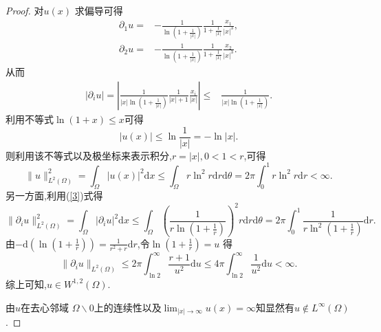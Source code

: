 \begin{proof}
  对$u(x)$ 求偏导可得
  \begin{align*}
    \partial_1u=&-\frac{1}{\ln(1+\frac{1}{|x|})}\frac{1}{1+\frac{1}{|x|}} \frac{x_1}{|x|^3},\\ 
    \partial_2u=&-\frac{1}{\ln(1+\frac{1}{|x|})}\frac{1}{1+\frac{1}{|x|}} \frac{x_2}{|x|^3}
  .\end{align*}
  从而
  \begin{align}\label{3}
    |\partial_i u|=\left| \frac{1}{|x| \ln(1+\frac{1}{|x|})} \frac{1}{|x|+1} \frac{x_i}{|x|}  \right| \le &  \frac{1}{|x|\ln(1+\frac{1}{|x|})}
  .\end{align}
   利用不等式$\ln(1+x)\le x$可得
   \[
     |u(x)|\le \ln \frac{1}{|x|}=-\ln|x|.
  \] 
  则利用该不等式以及极坐标来表示积分,$r=|x|,0<1<r$,可得
  \[
    \|u\|_{L^2(\Omega)}^2=\int_{\Omega}|u(x)|^2\mathrm{d}x\le \int_{\Omega}r\ln^2r \mathrm{d}r\mathrm{d}\theta=2\pi\int_0^{1}r\ln^2r\mathrm{d}r<\infty.
  \]
  另一方面,利用(\ref{3})式得
  \[
    \|\partial_i u\|_{L^2(\Omega)}^2=\int_{\Omega}|\partial_iu|^2\mathrm{d}x\le \int_{\Omega} \left(\frac{1}{r\ln( 1+\frac{1}{r})}\right)^2 r\mathrm{d}r\mathrm{d}\theta=2\pi\int_0^{1}\frac{1}{r \ln^2(1+\frac{1}{r})}\mathrm{d}r.
  \] 
  由$-\mathrm{d}\left( \ln(1+\frac{1}{r}) \right)=\frac{1}{r^2+r}\mathrm{d}r $,令$\ln (1+\frac{1}{r})=u$ 得
  \[
    \|\partial_iu\|_{L^2(\Omega)}\le 2\pi\int_{\ln 2}^{\infty}\frac{r+1}{u^2}\mathrm{d}u\le 4\pi \int_{\ln 2}^{\infty}\frac{1}{u^2}\mathrm{d}u<\infty.
  \] 
  综上可知,$u\in W^{1,2}(\Omega)$.

  由$u$在去心邻域 $\Omega \backslash 0$上的连续性以及$\lim_{|x|\to \infty}u(x)=\infty$知显然有$u\notin L^{\infty}(\Omega)$.
\end{proof}

